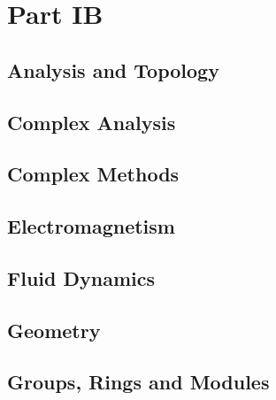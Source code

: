 \part{Part IB}

\chapter{Analysis and Topology}
\begingroup
\graphicspath{{../part-ib/analysis-and-topology/}}


\endgroup
\chapter{Complex Analysis}
\begingroup
\graphicspath{{../part-ib/complex-analysis/}}


\endgroup
\chapter{Complex Methods}
\begingroup
\graphicspath{{../part-ib/complex-methods/}}


\endgroup
\chapter{Electromagnetism}
\begingroup
\graphicspath{{../part-ib/electromagnetism/}}


\endgroup
\chapter{Fluid Dynamics}
\begingroup
\graphicspath{{../part-ib/fluid-dynamics/}}


\endgroup
\chapter{Geometry}
\begingroup
\graphicspath{{../part-ib/geometry/}}


\endgroup
\chapter{Groups, Rings and Modules}
\begingroup
\graphicspath{{../part-ib/groups-rings-and-modules/}}


\endgroup
